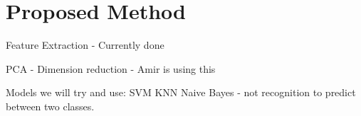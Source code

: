 \section{Proposed Method}
\label{sec:proposed_method}
Feature Extraction - Currently done

PCA - Dimension reduction - Amir is using this

Models we will try and use:
SVM
KNN
Naive Bayes - not recognition to predict between two classes.
